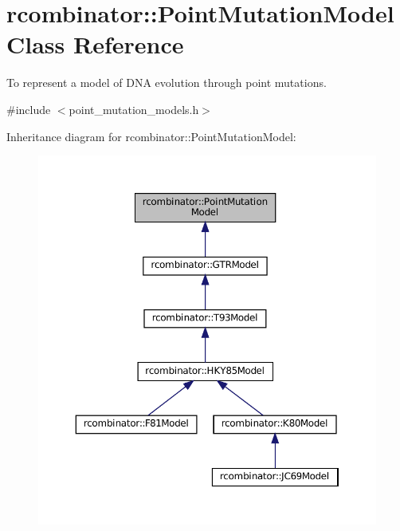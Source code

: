 \hypertarget{classrcombinator_1_1PointMutationModel}{}\section{rcombinator\+:\+:Point\+Mutation\+Model Class Reference}
\label{classrcombinator_1_1PointMutationModel}


To represent a model of D\+NA evolution through point mutations.  




{\ttfamily \#include $<$point\+\_\+mutation\+\_\+models.\+h$>$}



Inheritance diagram for rcombinator\+:\+:Point\+Mutation\+Model\+:\nopagebreak
\begin{figure}[H]
\begin{center}
\leavevmode
\includegraphics[width=350pt]{classrcombinator_1_1PointMutationModel__inherit__graph}
\end{center}
\end{figure}
